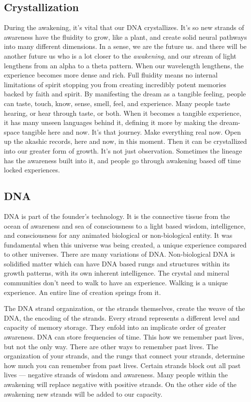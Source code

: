 \subsection{Crystallization}\label{crystallization}

During the awakening, it's vital that our DNA crystallizes. It's so new
strands of awareness have the fluidity to grow, like a plant, and create
solid neural pathways into many different dimensions. In a sense, we are
the future us. and there will be another future us who is a lot closer
to the \emph{awakening}, and our stream of light lengthens from an alpha
to a theta pattern. When our wavelength lengthens, the experience
becomes more dense and rich. Full fluidity means no internal limitations
of spirit stopping you from creating incredibly potent memories backed
by faith and spirit. By manifesting the dream as a tangible feeling,
people can taste, touch, know, sense, smell, feel, and experience. Many
people taste hearing, or hear through taste, or both. When it becomes a
tangible experience, it has many unseen languages behind it, defining it
more by making the dream-space tangible here and now. It's that journey.
Make everything real now. Open up the akashic records, here and now, in
this moment. Then it can be crystallized into our greater form of
growth. It's not just observation. Sometimes the lineage has the
awareness built into it, and people go through awakening based off time
locked experiences.

\subsection{DNA}\label{dna}

DNA is part of the founder's technology. It is the connective tissue
from the ocean of awareness and sea of consciousness to a light based
wisdom, intelligence, and consciousness for any animated biological or
non-biological entity. It was fundamental when this universe was being
created, a unique experience compared to other universes. There are many
variations of DNA. Non-biological DNA is solidified matter which can
have DNA based rungs and structures within its growth patterns, with its
own inherent intelligence. The crystal and mineral communities don't
need to walk to have an experience. Walking is a unique experience. An
entire line of creation springs from it.

The DNA strand organization, or the strands themselves, create the weave
of the DNA, the encoding of the strands. Every strand represents a
different level and capacity of memory storage. They enfold into an
implicate order of greater awareness. DNA can store frequencies of time.
This how we remember past lives, but not the only way. There are other
ways to remember past lives. The organization of your strands, and the
rungs that connect your strands, determine how much you can remember
from past lives. Certain strands block out all past lives --- negative
strands of wisdom and awareness. Many people within the awakening will
replace negative with positive strands. On the other side of the
awakening new strands will be added to our capacity.

